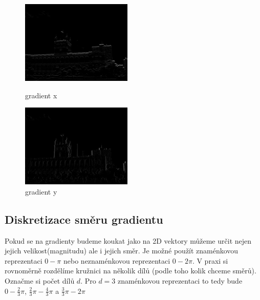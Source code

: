 \documentclass{report}
\begin{document}
\begin{figure}[H]
	\centering
	\begin{minipage}[c]{150pt}
		\centering
		\includegraphics[width=150pt]{./img/gradientX.png}
		\caption{gradient x}
	\end{minipage}
	\begin{minipage}[c]{150pt}
		\includegraphics[width=150pt]{./img/gradientY.png}
		\caption{gradient y}
		\centering
	\end{minipage}
\end{figure}

\subsection{Diskretizace směru gradientu}
Pokud se na gradienty budeme koukat jako na 2D vektory můžeme určit nejen jejich velikost(magnitudu) ale i jejich směr. Je možné použít znaménkovou reprezentaci $0 - \pi$ nebo neznaménkovou reprezentaci $0 - 2\pi$.  V praxi si rovnoměrně rozdělíme kružnici na několik dílů (podle toho kolik chceme směrů). Označme si počet dílů $d$. Pro $d = 3$ znaménkovou reprezentaci to tedy bude $0 - \frac{2}{3}\pi$, $\frac{2}{3}\pi - \frac{4}{3}\pi$ a $\frac{3}{3}\pi - 2\pi$ 
\end{document}
